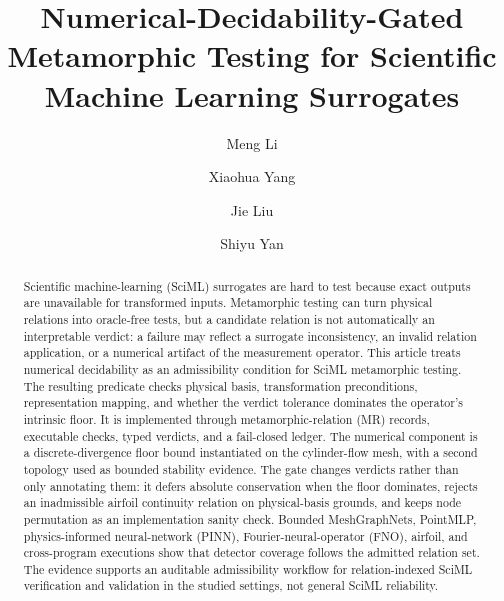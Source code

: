 \documentclass[preprint,12pt]{elsarticle}
\begin{document}
\begin{frontmatter}

\title{Numerical-Decidability-Gated Metamorphic Testing for Scientific Machine Learning Surrogates}

\author[inst1,inst2,inst3]{Meng Li}
\author[inst1,inst2,inst3]{Xiaohua Yang}
\author[inst1,inst2,inst3]{Jie Liu}
\author[inst1,inst2,inst3]{Shiyu Yan}

\begin{abstract}
Scientific machine-learning (SciML) surrogates are hard to test because exact
outputs are unavailable for transformed inputs. Metamorphic testing can
turn physical relations into oracle-free tests, but a candidate relation is not
automatically an interpretable verdict: a failure may reflect a surrogate
inconsistency, an invalid relation application, or a numerical artifact of the
measurement operator. This article treats numerical decidability as an
admissibility condition for SciML metamorphic testing. The resulting predicate
checks physical basis, transformation preconditions, representation mapping,
and whether the verdict tolerance dominates the operator's intrinsic floor. It
is implemented through metamorphic-relation (MR) records, executable checks, typed verdicts,
and a fail-closed ledger. The numerical component is a discrete-divergence
floor bound instantiated on the cylinder-flow mesh, with a second topology
used as bounded stability evidence. The gate changes verdicts rather than only annotating
them: it defers absolute conservation when the floor dominates, rejects an
inadmissible airfoil continuity relation on physical-basis grounds, and keeps
node permutation as an implementation sanity check. Bounded MeshGraphNets,
PointMLP, physics-informed neural-network (PINN), Fourier-neural-operator (FNO),
airfoil, and cross-program executions show that detector
coverage follows the admitted relation set. The evidence supports an auditable
admissibility workflow for relation-indexed SciML verification and validation in the studied settings,
not general SciML reliability.
\end{abstract}


\end{frontmatter}
\end{document}
